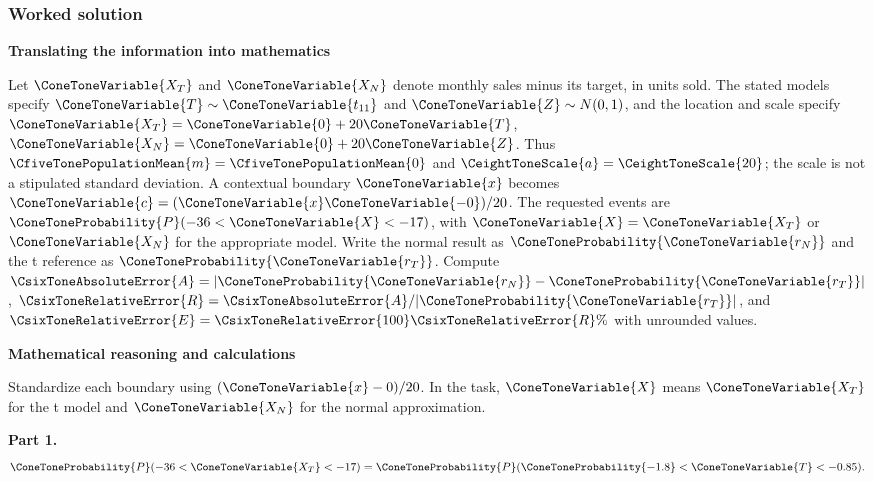 \subsubsection*{Worked solution}\label{sol:c9-d4}
\par\textbf{Translating the information into mathematics}\par
Let $\ConeToneVariable{X_T}$ and $\ConeToneVariable{X_N}$ denote monthly sales minus its target, in units sold. The stated models specify $\ConeToneVariable{T}\sim \ConeToneVariable{t_{11}}$ and $\ConeToneVariable{Z}\sim N(0,1)$, and the location and scale specify $\ConeToneVariable{X_T}=\ConeToneVariable{0}+20\ConeToneVariable{T}$, $\ConeToneVariable{X_N}=\ConeToneVariable{0}+20\ConeToneVariable{Z}$. Thus $\CfiveTonePopulationMean{m}=\CfiveTonePopulationMean{0}$ and $\CeightToneScale{a}=\CeightToneScale{20}$; the scale is not a stipulated standard deviation. A contextual boundary $\ConeToneVariable{x}$ becomes $\ConeToneVariable{c}=(\ConeToneVariable{x}\ConeToneVariable{-0})/20$. The requested events are $\ConeToneProbability{P}(-36<\ConeToneVariable{X}<-17)$, with $\ConeToneVariable{X}=\ConeToneVariable{X_T}$ or $\ConeToneVariable{X_N}$ for the appropriate model. Write the normal result as $\ConeToneProbability{\ConeToneVariable{r_N}}$ and the t reference as $\ConeToneProbability{\ConeToneVariable{r_T}}$. Compute $\CsixToneAbsoluteError{A}=|\ConeToneProbability{\ConeToneVariable{r_N}}-\ConeToneProbability{\ConeToneVariable{r_T}}|$, $\CsixToneRelativeError{R}=\CsixToneAbsoluteError{A}/|\ConeToneProbability{\ConeToneVariable{r_T}}|$, and $\CsixToneRelativeError{E}=\CsixToneRelativeError{100}\CsixToneRelativeError{R}\%$ with unrounded values.
\par\textbf{Mathematical reasoning and calculations}\par
Standardize each boundary using $(\ConeToneVariable{x}-0)/20$. In the task, $\ConeToneVariable{X}$ means $\ConeToneVariable{X_T}$ for the t model and $\ConeToneVariable{X_N}$ for the normal approximation.
\par\textbf{Part 1.}\[\ConeToneProbability{P}(-36<\ConeToneVariable{X_T}<-17)=\ConeToneProbability{P}(\ConeToneProbability{-1.8}<\ConeToneVariable{T}<-0.85).\]

